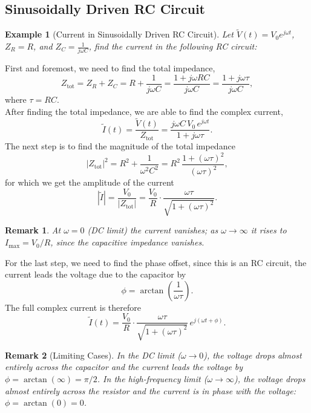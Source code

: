 \documentclass{article}
\newtheorem*{example}{Example}
\newtheorem{remark}{Remark}
\begin{document}
\subsection{Sinusoidally Driven RC Circuit}
\begin{example}[Current in Sinusoidally Driven RC Circuit]
    Let $\tilde{V}(t) = V_0 e^{j\omega t}$, $Z_R = R$, and $Z_C = \frac{1}{j\omega C}$, find the current in the following RC circuit:
    \begin{center}
    \end{center}
\end{example}
First and foremost, we need to find the total impedance,
\[Z_{\text{tot}} = Z_R + Z_C = R + \frac{1}{j\omega C} = \frac{1 + j\omega RC}{j\omega C} = \frac{1+j\omega\tau}{j\omega C},\]
where $\tau = RC$.\\
After finding the total impedance, we are able to find the complex current,
\[\tilde{I}(t) = \frac{\tilde{V}(t)}{Z_{\text{tot}}} = \frac{j\omega C\, V_0\, e^{j\omega t}}{1 + j\omega\tau}.\]
The next step is to find the magnitude of the total impedance
\[|Z_{\text{tot}}|^2 = R^2 + \frac{1}{\omega^2 C^2} = R^2\,\frac{1 + (\omega\tau)^2}{(\omega\tau)^2},\]
for which we get the amplitude of the current
\[|\tilde{I}| = \frac{V_0}{|Z_{\text{tot}}|} = \frac{V_0}{R}\cdot\frac{\omega\tau}{\sqrt{1+(\omega\tau)^2}}.\]
\begin{remark}
    At $\omega = 0$ (DC limit) the current vanishes; as $\omega\to\infty$ it rises to $I_{\max} = V_0/R$, since the capacitive impedance vanishes.
\end{remark}
For the last step, we need to find the phase offset, since this is an RC circuit, the current leads the voltage due to the capacitor by
\[\phi = \arctan\!\left(\frac{1}{\omega\tau}\right).\]
The full complex current is therefore
\[\tilde{I}(t) = \frac{V_0}{R}\cdot\frac{\omega\tau}{\sqrt{1+(\omega\tau)^2}}\,e^{j(\omega t + \phi)}.\]
\begin{remark}[Limiting Cases]
    In the DC limit ($\omega\to 0$), the voltage drops almost entirely across the capacitor and the current leads the voltage by $\phi = \arctan(\infty) = \pi/2$. In the high-frequency limit ($\omega\to\infty$), the voltage drops almost entirely across the resistor and the current is in phase with the voltage: $\phi = \arctan(0) = 0$.
\end{remark}
\end{document}
